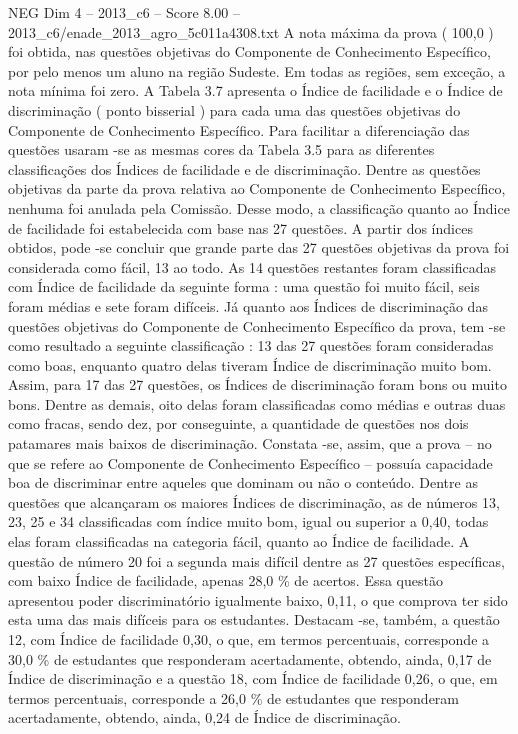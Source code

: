 \begin{textsample}{NEG Dim 4 – 2013\_c6 – Score 8.00 – 2013\_c6/enade\_2013\_agro\_5c011a4308.txt}
A nota máxima da prova ( 100,0 ) foi obtida, nas questões objetivas do Componente de Conhecimento Específico, por pelo menos um aluno na região Sudeste.
Em todas as regiões, sem exceção, a nota mínima foi zero.
A Tabela 3.7 apresenta o Índice de facilidade e o Índice de discriminação ( ponto bisserial ) para cada uma das questões objetivas do Componente de Conhecimento Específico.
Para facilitar a diferenciação das questões usaram -se as mesmas cores da Tabela 3.5 para as diferentes classificações dos Índices de facilidade e de discriminação.
Dentre as questões objetivas da parte da prova relativa ao Componente de Conhecimento Específico, nenhuma foi anulada pela Comissão.
Desse modo, a classificação quanto ao Índice de facilidade foi estabelecida com base nas 27 questões.
A partir dos índices obtidos, pode -se concluir que grande parte das 27 questões objetivas da prova foi considerada como fácil, 13 ao todo.
As 14 questões restantes foram classificadas com Índice de facilidade da seguinte forma : uma questão foi muito fácil, seis foram médias e sete foram difíceis.
Já quanto aos Índices de discriminação das questões objetivas do Componente de Conhecimento Específico da prova, tem -se como resultado a seguinte classificação : 13 das 27 questões foram consideradas como boas, enquanto quatro delas tiveram Índice de discriminação muito bom.
Assim, para 17 das 27 questões, os Índices de discriminação foram bons ou muito bons.
Dentre as demais, oito delas foram classificadas como médias e outras duas como fracas, sendo dez, por conseguinte, a quantidade de questões nos dois patamares mais baixos de discriminação.
Constata -se, assim, que a prova – no que se refere ao Componente de Conhecimento Específico – possuía capacidade boa de discriminar entre aqueles que dominam ou não o conteúdo.
Dentre as questões que alcançaram os maiores Índices de discriminação, as de números 13, 23, 25 e 34 classificadas com índice muito bom, igual ou superior a 0,40, todas elas foram classificadas na categoria fácil, quanto ao Índice de facilidade.
A questão de número 20 foi a segunda mais difícil dentre as 27 questões específicas, com baixo Índice de facilidade, apenas 28,0 \% de acertos.
Essa questão apresentou poder discriminatório igualmente baixo, 0,11, o que comprova ter sido esta uma das mais difíceis para os estudantes.
Destacam -se, também, a questão 12, com Índice de facilidade 0,30, o que, em termos percentuais, corresponde a 30,0 \% de estudantes que responderam acertadamente, obtendo, ainda, 0,17 de Índice de discriminação e a questão 18, com Índice de facilidade 0,26, o que, em termos percentuais, corresponde a 26,0 \% de estudantes que responderam acertadamente, obtendo, ainda, 0,24 de Índice de discriminação.

\end{textsample}
